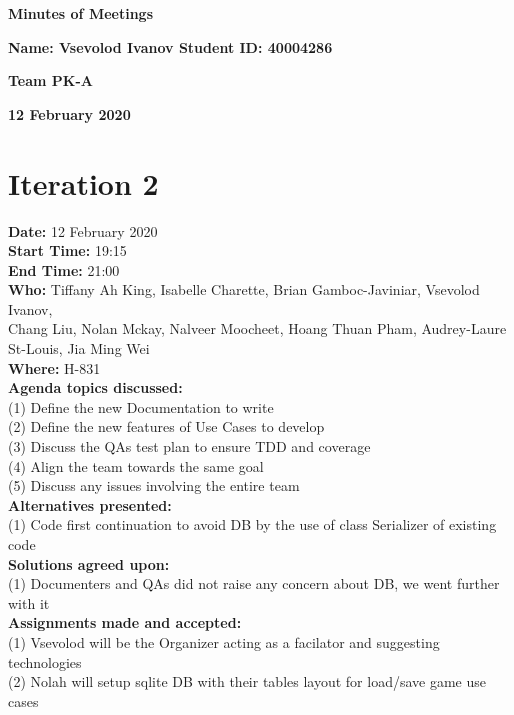 \documentclass[12pt]{article}
\begin{document}
\vspace*{0.2in}
\centerline{\bf\Large Minutes of Meetings}

\vspace*{0.2in}
\centerline{\bf\Large Name: Vsevolod Ivanov   Student ID: 40004286}

\vspace*{0.2in}
\centerline{\bf\Large Team PK-A}

\vspace*{0.2in}
\centerline{\bf\Large 12 February 2020}

\newpage

\section{Iteration 2}

{\bf Date:} 12 February 2020\\
{\bf Start Time:} 19:15\\
{\bf End Time:} 21:00\\
{\bf Who:} Tiffany Ah King, Isabelle Charette, Brian Gamboc-Javiniar, Vsevolod Ivanov,\\
Chang Liu, Nolan Mckay, Nalveer Moocheet, Hoang Thuan Pham, Audrey-Laure St-Louis, Jia Ming Wei\\
{\bf Where:} H-831\\
{\bf Agenda topics discussed:} \\
(1) Define the new Documentation to write\\
(2) Define the new features of Use Cases to develop\\
(3) Discuss the QAs test plan to ensure TDD and coverage\\
(4) Align the team towards the same goal\\
(5) Discuss any issues involving the entire team\\
{\bf Alternatives presented:} \\
(1) Code first continuation to avoid DB by the use of class Serializer of existing code \\
{\bf Solutions agreed upon:} \\
(1) Documenters and QAs did not raise any concern about DB, we went further with it\\
{\bf Assignments made and accepted:} \\
(1) Vsevolod will be the Organizer acting as a facilator and suggesting technologies \\
(2) Nolah will setup sqlite DB with their tables layout for load/save game use cases\\
\end{document}
